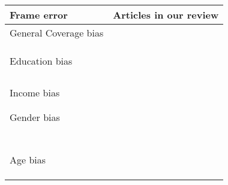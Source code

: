 \begin{table}
    \centering
	\begin{tabular}{ll}
		\toprule
		Frame error & Articles in our review\\
		\midrule
        General Coverage bias & \cite{keusch_coverage_2020, revilla_online_2016}\\
        & \cite{gummer_does_2019, bucher_exploring_2021}\\
        & \cite{de_bruijne_mobile_2014, fuchs_coverage_2009}\\
        & \cite{wells_what_2015}\\
        Education bias & \cite{de_bruijne_comparing_2013, keusch_coverage_2020}\\
        & \cite{gummer_does_2019, de_bruijne_mobile_2014}\\
        & \cite{zou_mobile_2021, skeie_smartphone_2019}\\
        & \cite{keusch_using_2021, keusch_web_2017}\\
        & \cite{toepoel_what_2014, wenz_willingness_2019}\\
        Income bias & \cite{haan_can_2019, zou_mobile_2021}\\
        & \cite{ skeie_smartphone_2019, toepoel_what_2014}\\
        & \cite{wenz_willingness_2019}\\
        Gender bias & \cite{haan_can_2019, de_bruijne_comparing_2013}\\
        & \cite{wells_comparison_2014, keusch_coverage_2020}\\
        & \cite{liebe_does_2015, lambert_living_2015}\\
        & \cite{bosch_measurement_2019, schlosser_mobile_2018}\\
        & \cite{de_bruijne_mobile_2014, zou_mobile_2021}\\
        & \cite{brosnan_pc_2017, skeie_smartphone_2019}\\
        & \cite{keusch_web_2017, toepoel_what_2014}\\
        & \cite{wenz_willingness_2019}\\
        Age bias & \cite{haan_can_2019, de_bruijne_comparing_2013}\\
        & \cite{wells_comparison_2014, keusch_coverage_2020}\\
        & \cite{revilla_online_2016, gummer_does_2019}\\
        & \cite{liebe_does_2015, bosch_measurement_2019}\\

\end{tabular}
\end{table}
